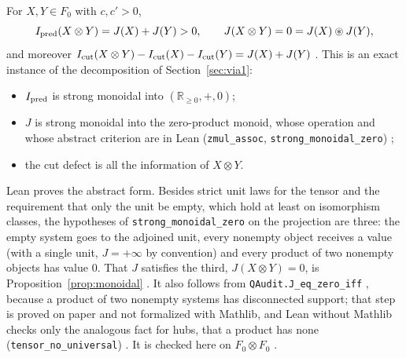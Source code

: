 For $X,Y\in F_0$ with $c,c'>0$,
\begin{equation}
I_{\rm pred}(X\otimes Y)=J(X)+J(Y)>0,\qquad J(X\otimes Y)=0=J(X)\circledast J(Y),
\end{equation}
and moreover $I_{\rm cut}(X\otimes Y)-I_{\rm cut}(X)-I_{\rm cut}(Y)=J(X)+J(Y)$ \stS. This is an exact instance of the decomposition of Section~\ref{sec:via1}:
\begin{itemize}
\item $I_{\rm pred}$ is strong monoidal into $(\mathbb R_{\ge0},+,0)$;
\item $J$ is strong monoidal into the zero-product monoid, whose operation and whose abstract criterion are in Lean (\texttt{zmul\_assoc}, \texttt{strong\_monoidal\_zero}) \stL;
\item the cut defect is all the information of $X\otimes Y$.
\end{itemize}
Lean proves the abstract form. Besides strict unit laws for the tensor and the requirement that only the unit be empty, which hold at least on isomorphism classes, the hypotheses of \texttt{strong\_monoidal\_zero} on the projection are three: the empty system goes to the adjoined unit, every nonempty object receives a value (with a single unit, $J=+\infty$ by convention) and every product of two nonempty objects has value $0$. That $J$ satisfies the third, $J(X\otimes Y)=0$, is Proposition~\ref{prop:monoidal} \stA. It also follows from \texttt{QAudit.J\_eq\_zero\_iff} \stM, because a product of two nonempty systems has disconnected support; that step is proved on paper and not formalized with Mathlib, and Lean without Mathlib checks only the analogous fact for hubs, that a product has none (\texttt{tensor\_no\_universal}) \stL. It is checked here on $F_0\otimes F_0$ \stS.

